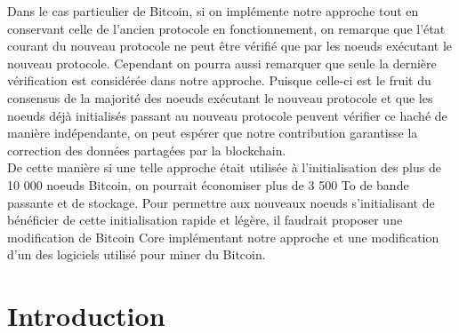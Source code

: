 \documentclass[12pt,a4paper]{article}
\begin{document}
	Dans le cas particulier de Bitcoin, si on implémente notre approche tout en conservant celle de l'ancien protocole en fonctionnement, on remarque que l'état courant du nouveau protocole ne peut être vérifié que par les noeuds exécutant le nouveau protocole. Cependant on pourra aussi remarquer que seule la dernière vérification est considérée dans notre approche. Puisque celle-ci est le fruit du consensus de la majorité des noeuds exécutant le nouveau protocole et que les noeuds déjà initialisés passant au nouveau protocole peuvent vérifier ce haché de manière indépendante, on peut espérer que notre contribution garantisse la correction des données partagées par la blockchain.\\ %
	De cette manière si une telle approche était utilisée à l'initialisation des plus de 10 000 noeuds Bitcoin, on pourrait économiser plus de 3 500 To de bande passante et de stockage. Pour permettre aux nouveaux noeuds s'initialisant de bénéficier de cette initialisation rapide et légère, il faudrait proposer une modification de Bitcoin Core implémentant notre approche et une modification d'un des logiciels utilisé pour miner du Bitcoin.
	
	\tableofcontents
	
	\newpage
	
	\section{Introduction} %
	
\end{document}
